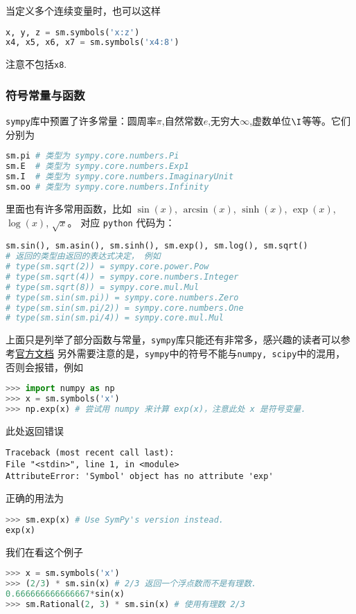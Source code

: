当定义多个连续变量时，也可以这样
\begin{lstlisting}[language=python]
x, y, z = sm.symbols('x:z')
x4, x5, x6, x7 = sm.symbols('x4:8')
\end{lstlisting}
注意不包括\verb|x8|.

\subsubsection{符号常量与函数}
\verb|sympy|库中预置了许多常量：圆周率$\pi$,自然常数$e$,无穷大$\infty$,虚数单位$\I$等等。它们分别为
\begin{lstlisting}[language=python]
sm.pi # 类型为 sympy.core.numbers.Pi
sm.E  # 类型为 sympy.core.numbers.Exp1
sm.I  # 类型为 sympy.core.numbers.ImaginaryUnit
sm.oo # 类型为 sympy.core.numbers.Infinity 
\end{lstlisting}
里面也有许多常用函数，比如 $\sin(x)$, $\arcsin(x)$, $\sinh(x)$, $\exp(x)$, $\log(x)$, $\sqrt{x}$。 对应 \verb|python| 代码为：
\begin{lstlisting}[language=python]
sm.sin(), sm.asin(), sm.sinh(), sm.exp(), sm.log(), sm.sqrt()
# 返回的类型由返回的表达式决定， 例如
# type(sm.sqrt(2)) = sympy.core.power.Pow
# type(sm.sqrt(4)) = sympy.core.numbers.Integer
# type(sm.sqrt(8)) = sympy.core.mul.Mul
# type(sm.sin(sm.pi)) = sympy.core.numbers.Zero
# type(sm.sin(sm.pi/2)) = sympy.core.numbers.One
# type(sm.sin(sm.pi/4)) = sympy.core.mul.Mul
\end{lstlisting}
上面只是列举了部分函数与常量，\verb|sympy|库只能还有非常多，感兴趣的读者可以参考\href{https://docs.sympy.org/latest/index.html}{官方文档}
另外需要注意的是，\verb|sympy|中的符号不能与\verb|numpy, scipy|中的混用，否则会报错，例如
\begin{lstlisting}[language=python]
>>> import numpy as np
>>> x = sm.symbols('x')
>>> np.exp(x) # 尝试用 numpy 来计算 exp(x)，注意此处 x 是符号变量.
\end{lstlisting}
此处返回错误
\begin{lstlisting}[language=none]
Traceback (most recent call last):
File "<stdin>", line 1, in <module>
AttributeError: 'Symbol' object has no attribute 'exp'
\end{lstlisting}
正确的用法为
\begin{lstlisting}[language=python]
>>> sm.exp(x) # Use SymPy's version instead.
exp(x)
\end{lstlisting}
我们在看这个例子
\begin{lstlisting}[language=python]
>>> x = sm.symbols('x')
>>> (2/3) * sm.sin(x) # 2/3 返回一个浮点数而不是有理数.
0.666666666666667*sin(x)
>>> sm.Rational(2, 3) * sm.sin(x) # 使用有理数 2/3
\end{lstlisting}
